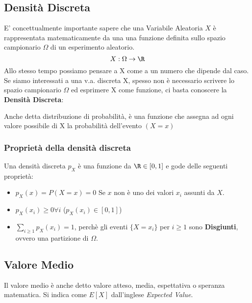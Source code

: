 \subsection{Densità Discreta}
E' concettualmente importante sapere che una Variabile Aleatoria $X$ è rappresentata matematicamente da una
una funzione definita sullo spazio campionario $\Omega$ di un esperimento aleatorio.
\[
	X:\Omega \to \R
\]
Allo stesso tempo possiamo pensare a X come a un numero che dipende dal caso.
Se siamo interessati a una v.a. discreta X, spesso non è necessario scrivere lo
spazio campionario $\Omega$ ed esprimere X come funzione,
ci basta conoscere la \textbf{Densità Discreta}:

Anche detta distribuzione di probabilità, è una funzione che assegna
ad ogni valore possibile di X la probabilità dell'evento $(X = x)$
\subsubsection{Proprietà della densità discreta}
Una densità discreta $p_X$ è una funzione da $\R \in [0,1]$ e gode delle seguenti proprietà:
\begin{itemize}
	\item $p_X(x) = P(X=x) = 0$ Se $x$ non è uno dei valori $x_i$ assunti da $X$.
	\item $p_X(x_i) \geq 0 \forall i$ ($p_X(x_i)\in [0,1]$)
	\item $\sum_{i\geq 1} p_X(x_i) = 1$, perchè gli eventi $\{X=x_i\}$ per $i\geq 1$ sono \textbf{Disgiunti}, ovvero una partizione di $\Omega$.
\end{itemize}

\subsection{Valore Medio}
Il valore medio è anche detto valore atteso, media, espettativa o speranza matematica.
Si indica come $E[X]$ dall'inglese \emph{Expected Value}.

